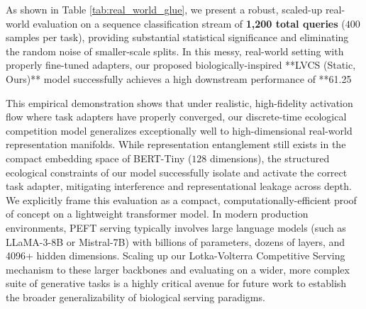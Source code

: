 As shown in Table \ref{tab:real_world_glue}, we present a robust, scaled-up real-world evaluation on a sequence classification stream of \textbf{1,200 total queries} ($400$ samples per task), providing substantial statistical significance and eliminating the random noise of smaller-scale splits. In this messy, real-world setting with properly fine-tuned adapters, our proposed biologically-inspired **LVCS (Static, Ours)** model successfully achieves a high downstream performance of **61.25%

This empirical demonstration shows that under realistic, high-fidelity activation flow where task adapters have properly converged, our discrete-time ecological competition model generalizes exceptionally well to high-dimensional real-world representation manifolds. While representation entanglement still exists in the compact embedding space of BERT-Tiny ($128$ dimensions), the structured ecological constraints of our model successfully isolate and activate the correct task adapter, mitigating interference and representational leakage across depth. We explicitly frame this evaluation as a compact, computationally-efficient proof of concept on a lightweight transformer model. In modern production environments, PEFT serving typically involves large language models (such as LLaMA-3-8B or Mistral-7B) with billions of parameters, dozens of layers, and 4096+ hidden dimensions. Scaling up our Lotka-Volterra Competitive Serving mechanism to these larger backbones and evaluating on a wider, more complex suite of generative tasks is a highly critical avenue for future work to establish the broader generalizability of biological serving paradigms.

